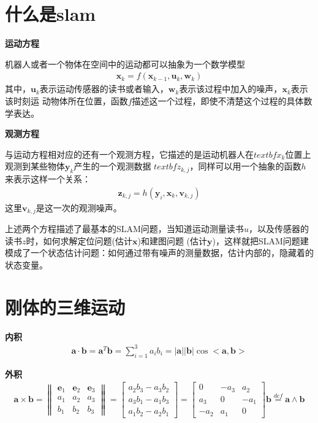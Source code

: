 \documentclass[10pt]{article}
\begin{document}
\tableofcontents
\section{什么是slam}

\textbf{运动方程}

机器人或者一个物体在空间中的运动都可以抽象为一个数学模型
\begin{align}\textbf{x}_k=f(\textbf{x}_{k-1},\textbf{u}_k,\textbf{w}_k) \end{align}
\indent 其中，$\textbf{u}_k$表示运动传感器的读书或者输入，$\textbf{w}_k$表示该过程中加入的噪声，$\textbf{x}_k$表示该时刻运
动物体所在位置，函数$f$描述这一个过程，即使不清楚这个过程的具体数学表达。

\textbf{观测方程}

与运动方程相对应的还有一个观测方程，它描述的是运动机器人在$textbf{x}_k$位置上观测到某些物体$\textbf{y}_k$产生的一个观测数据
$textbf{z}_{k,j}$，同样可以用一个抽象的函数$h$来表示这样一个关系：
\begin{align}\textbf{z}_{k,j}=h(\textbf{y}_i,\textbf{x}_k,\textbf{v}_{k,j})\end{align}
\indent 这里$\textbf{v}_{k,j}$是这一次的观测噪声。

上述两个方程描述了最基本的SLAM问题，当知道运动测量读书$u$，以及传感器的读书$z$时，如何求解定位问题(估计$\textbf{x}$)和建图问题
(估计$\textbf{y}$)，这样就把SLAM问题建模成了一个状态估计问题：如何通过带有噪声的测量数据，估计内部的，隐藏着的状态变量。
\section{刚体的三维运动}
\textbf{内积}
\begin{align}\textbf{a} \cdot \textbf{b}=\textbf{a}^{T}\textbf{b}=\sum_{i=1}^{3}a_{i}b_{i}=|\textbf{a}||\textbf{b}|\cos<\textbf{a},
\textbf{b}>\end{align}

\textbf{外积}
\begin{align}\textbf{a}\times\textbf{b}=\left\|\begin{array}{lll}\textbf{e}_1 & \textbf{e}_2 & \textbf{e}_3 \\ a_1 & a_2 &
    a_3 \\ b_1 & b_2 & b_3 \end{array}\right\|=\left[\begin{array}{l}a_2b_3-a_3b_2 \\ a_3b_1-a_1b_3 \\ a_1b_2-a_2
        b_1\end{array}\right]=\left[\begin{array}{ccc}0 & -a_3 & a_2 \\ a_3 & 0 & -a_1 \\ -a_2 & a_1 & 0\end{array}
        \right]\textbf{b} \overset{def}{=}\textbf{a} \wedge \textbf{b}\end{align}
\end{document}
